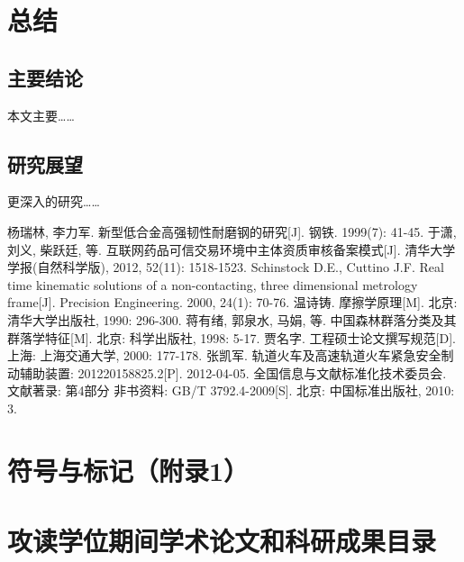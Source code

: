 \documentclass[UTF8,a4paper,12pt]{ctexart}
\numberwithin{equation}{section}
\begin{document}
\section{总结}

\subsection{主要结论}
本文主要……

\subsection{研究展望}
更深入的研究……

\newpage
{}

\renewcommand\refname{参\quad 考\quad 文\quad 献}
\begin{thebibliography}{1}
 杨瑞林, 李力军. 新型低合金高强韧性耐磨钢的研究[J]. 钢铁. 1999(7): 41-45.
 于潇, 刘义, 柴跃廷, 等. 互联网药品可信交易环境中主体资质审核备案模式[J]. 清华大学学报(自然科学版), 2012, 52(11): 1518-1523.
 Schinstock D.E., Cuttino J.F. Real time kinematic solutions of a non-contacting, three dimensional metrology frame[J]. Precision Engineering. 2000, 24(1): 70-76. 
 温诗铸. 摩擦学原理[M]. 北京: 清华大学出版社, 1990: 296-300.
 蒋有绪, 郭泉水, 马娟, 等. 中国森林群落分类及其群落学特征[M]. 北京: 科学出版社, 1998: 5-17.
 贾名字. 工程硕士论文撰写规范[D]. 上海: 上海交通大学, 2000: 177-178.
 张凯军. 轨道火车及高速轨道火车紧急安全制动辅助装置: 201220158825.2[P]. 2012-04-05.
 全国信息与文献标准化技术委员会. 文献著录: 第4部分 非书资料: GB/T 3792.4-2009[S]. 北京: 中国标准出版社, 2010: 3.
\end{thebibliography}%

\newpage
{}

\section*{符号与标记（附录1）}

\newpage
{}

\section*{攻读学位期间学术论文和科研成果目录}
\end{document}
